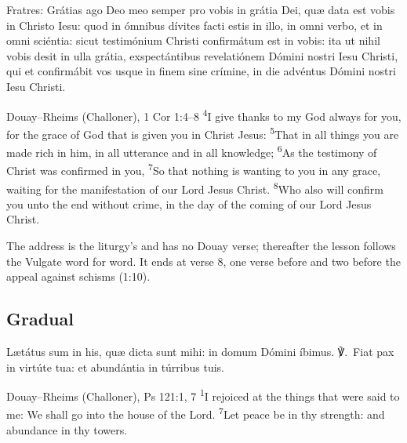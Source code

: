 
\begin{latinproper}
Fratres: Grátias ago Deo meo semper pro vobis in grátia Dei, quæ data est
vobis in Christo Iesu: quod in ómnibus dívites facti estis in illo, in omni
verbo, et in omni sciéntia: sicut testimónium Christi confirmátum est in vobis:
ita ut nihil vobis desit in ulla grátia, exspectántibus revelatiónem Dómini
nostri Iesu Christi, qui et confirmábit vos usque in finem sine crímine, in
die advéntus Dómini nostri Iesu Christi.
\end{latinproper}

\begin{englishwitness}{Douay--Rheims (Challoner), 1 Cor 1:4--8}
\textsuperscript{4}I give thanks to my God always for you, for the grace of
God that is given you in Christ Jesus: \textsuperscript{5}That in all things
you are made rich in him, in all utterance and in all knowledge;
\textsuperscript{6}As the testimony of Christ was confirmed in you,
\textsuperscript{7}So that nothing is wanting to you in any grace, waiting for
the manifestation of our Lord Jesus Christ. \textsuperscript{8}Who also will
confirm you unto the end without crime, in the day of the coming of our Lord
Jesus Christ.
\end{englishwitness}

\noindent The address  is the liturgy's and has no Douay verse;
thereafter the lesson follows the Vulgate word for word. It ends at verse 8,
one verse before  and two before the appeal against schisms
(1:10).

\subsection{Gradual}
\label{proper-gradual}


\begin{latinproper}
Lætátus sum in his, quæ dicta sunt mihi: in domum Dómini íbimus. ℣.~Fiat pax
in virtúte tua: et abundántia in túrribus tuis.
\end{latinproper}

\begin{englishwitness}{Douay--Rheims (Challoner), Ps 121:1, 7}
\textsuperscript{1}I rejoiced at the things that were said to me: We shall go
into the house of the Lord. \textsuperscript{7}Let peace be in thy strength:
and abundance in thy towers.
\end{englishwitness}

